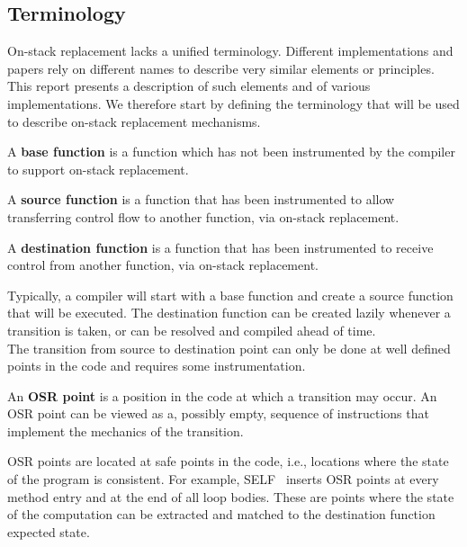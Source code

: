 \subsection{Terminology}

On-stack replacement lacks a unified terminology.
Different implementations and papers rely on different names to describe very similar elements or principles.
This report presents a description of such elements and of various implementations.
We therefore start by defining the terminology that will be used to describe on-stack replacement mechanisms.

\begin{definition}\label{base}
A {\bf base function} is a function which has not been instrumented by the
compiler to support on-stack replacement.
\end{definition}

\begin{definition}\label{from}
A {\bf source function} is a function that has been instrumented to allow
transferring control flow to another function, via on-stack replacement.
\end{definition}

\begin{definition}\label{continuation}
A {\bf destination function} is a function that has been instrumented to
receive control from another function, via on-stack replacement.
\end{definition}

Typically, a compiler will start with a base function and create a source
function that will be executed. The destination function can be created
lazily whenever a transition is taken, or can be resolved and compiled ahead of time.\\

The transition from source to destination point can only be done at well
defined points in the code and requires some instrumentation.

\begin{definition}\label{OSRPointDefinition}
An {\bf OSR point} is a position in the code at which a transition may occur. An
OSR point can be viewed as a, possibly empty, sequence of instructions that implement
the mechanics of the transition.
\end{definition}

OSR points are located at safe points in the code, i.e., locations where the state
of the program is consistent. For example, SELF~\cite{holzle1992debugging}
inserts OSR points at every method entry and at the end of all loop bodies. These
are points where the state of the computation can be extracted and matched to the
destination function expected state.\\

